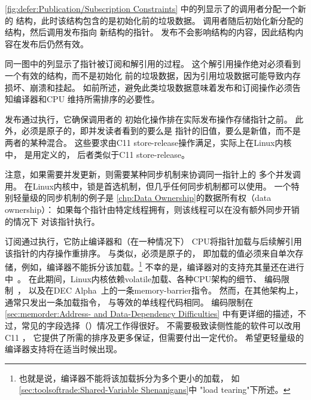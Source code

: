 \cref{fig:defer:Publication/Subscription Constraints}
中的列显示了的调用者分配一个新的
结构，此时该结构包含的是初始化前的垃圾数据。
调用者随后初始化新分配的结构，然后调用发布指向
新结构的指针。
发布不会影响结构的内容，因此结构内容在发布后仍然有效。

同一图中的列显示了指针被订阅和解引用的过程。
这个解引用操作绝对必须看到一个有效的结构，而不是初始化
前的垃圾数据，因为引用垃圾数据可能导致内存损坏、崩溃和挂起。
如前所述，避免此类垃圾数据意味着发布和订阅操作必须告知编译器和CPU
维持所需排序的必要性。

发布通过执行，它确保调用者的
初始化操作排在实际发布操作存储指针之前。
此外，必须是原子的，即并发读者看到的要么是
指针的旧值，要么是新值，而不是两者的某种混合。
这些要求由C11 store-release操作满足，实际上在Linux内核中，
是用定义的，
后者类似于C11 store-release。

注意，如果需要并发更新，则需要某种同步机制来协调同一指针上的
多个并发调用。
在Linux内核中，锁是首选机制，但几乎任何同步机制都可以使用。
一个特别轻量级的同步机制的例子是
\cref{chp:Data Ownership}的数据所有权（data ownership）：
如果每个指针由特定线程拥有，则该线程可以在没有额外同步开销的情况下
对该指针执行。

\QuickQuizEnd

订阅通过执行，它防止编译器和（在一种情况下）
CPU将指针加载与后续解引用该指针的内存操作重排序。
与类似，必须是原子的，
即加载的值必须来自单次存储，例如，编译器不能拆分该加载。\footnote{
	也就是说，编译器不能将该加载拆分为多个更小的加载，
	如\cref{sec:toolsoftrade:Shared-Variable Shenanigans}中
	"load tearing"下所述。}
不幸的是，编译器对的支持充其量还在进行中~\cite{PaulEMcKennneyConsumeP0190R4,PaulEMcKenney2017markconsumeP0462R1,JFBastien2018P0750R1consume}。
在此期间，Linux内核依赖volatile加载、各种CPU架构的细节、
编码限制~\cite{PaulEMcKenney2014rcu-dereference}，
以及在DEC Alpha~\cite{ALPHA2002}上的一条memory-barrier指令。
然而，在其他架构上，通常只发出一条加载指令，
与等效的单线程代码相同。
编码限制在
\cref{sec:memorder:Address- and Data-Dependency Difficulties}
中有更详细的描述，不过，常见的字段选择（\qtco{->}）情况工作得很好。
不需要极致读侧性能的软件可以改用C11 ，
它提供了所需的排序及更多保证，但需要付出一定代价。
希望更轻量级的编译器支持将在适当时候出现。


